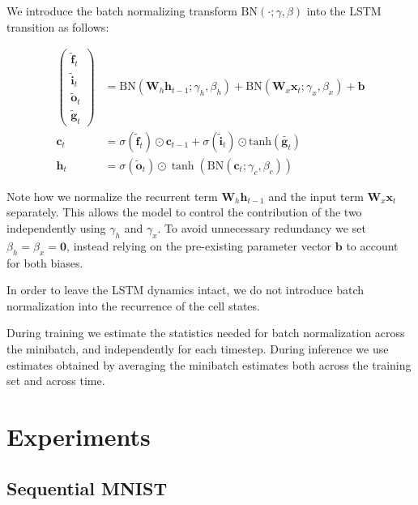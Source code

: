 \documentclass{article} %
\newcommand{\vect}[1]{\mathbf{#1}}
\newcommand{\mat}[1]{\mathbf{#1}}
\newcommand{\ewprod}{\odot}
\begin{document}
We introduce the batch normalizing transform $\mathrm{BN}(\cdot; \gamma, \beta)$ into the LSTM transition as follows:

\begin{align}
\left(\begin{array}{ccc}
\tilde{\vect{f}}_t \\
\tilde{\vect{i}}_t \\
\tilde{\vect{o}}_t \\
\tilde{\vect{g}}_t
\end{array}\right)
 &=
 \mathrm{BN} (\mat{W}_h \vect{h}_{t-1}; \gamma_h, \beta_h) +
 \mathrm{BN} (\mat{W}_x \vect{x}_t    ; \gamma_x, \beta_x) +
 \vect{b}
\\
\vect{c}_t &= \sigma(\tilde{\vect{f}}_t) \ewprod \vect{c}_{t-1} +
              \sigma(\tilde{\vect{i}}_t) \ewprod \mathrm{tanh}(\tilde{\vect{g}_t}) \\
\vect{h}_t &= \sigma(\tilde{\vect{o}}_t) \ewprod \tanh(
 \mathrm{BN} (\vect{c}_t; \gamma_c, \beta_c)
)
\end{align}

Note how we normalize the recurrent term $\mat{W}_h \vect{h}_{t-1}$ and the input term $\mat{W}_x \vect{x}_t$ separately.
This allows the model to control the contribution of the two independently using $\gamma_h$ and $\gamma_x$.
To avoid unnecessary redundancy we set $\beta_h = \beta_x = \vect{0}$, instead relying on the pre-existing parameter vector $\vect{b}$ to account for both biases.

In order to leave the LSTM dynamics intact, we do not introduce batch normalization into the recurrence of the cell states.

During training we estimate the statistics needed for batch normalization across the minibatch, and independently for each timestep.
During inference we use estimates obtained by averaging the minibatch estimates both across the training set and across time.

\section{Experiments}
\label{sec:experiments}

\subsection{Sequential MNIST}
\end{document}
